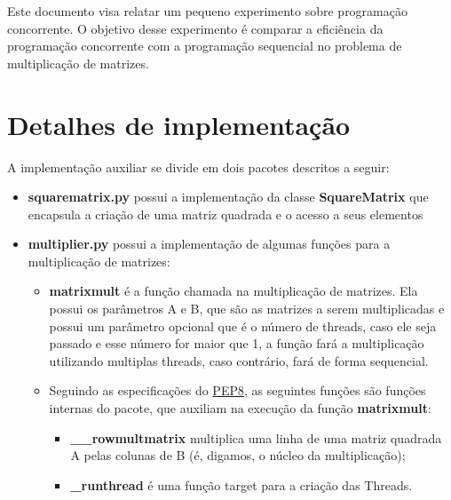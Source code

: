 \documentclass[12pt]{article}
\begin{document}
Este documento visa relatar um pequeno experimento sobre programação concorrente. O objetivo desse experimento é comparar a eficiência da programação concorrente com a programação sequencial no problema de multiplicação de matrizes.

\section{Detalhes de implementação}
A implementação auxiliar se divide em dois pacotes descritos a seguir:
\begin{itemize}
\item \textbf{squarematrix.py} possui a implementação da classe \textbf{SquareMatrix} que encapsula a criação de uma matriz quadrada e o acesso a seus elementos
\item \textbf{multiplier.py} possui a implementação de algumas funções para a multiplicação de matrizes:
	\begin{itemize}
	\item \textbf{matrixmult} é a função chamada na multiplicação de matrizes. Ela possui os parâmetros A e B, que são as matrizes a serem multiplicadas e possui um parâmetro opcional que é o número de threads, caso ele seja passado e esse número for maior que 1, a função fará a multiplicação utilizando multiplas threads, caso contrário, fará de forma sequencial.
    \item Seguindo as especificações do \href{https://www.python.org/dev/peps/pep-0008/}{PEP8}, as seguintes funções são funções internas do pacote, que auxiliam na execução da função \textbf{matrixmult}:
    \begin{itemize}
    \item \textbf{\_\_rowmultmatrix} multiplica uma linha de uma matriz quadrada A pelas colunas de B (é, digamos, o núcleo da multiplicação);
    \item \textbf{\_runthread} é uma função target para a criação das Threads.
    \end{itemize}
	\end{itemize}
\end{itemize}
\end{document}
